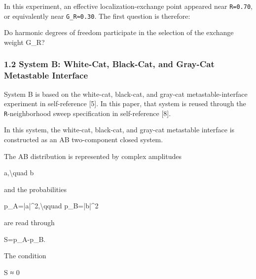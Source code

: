 \documentclass[
]{article}
\newenvironment{Shaded}{}{}
\newcommand{\NormalTok}[1]{#1}
\begin{document}
In this experiment, an effective localization-exchange point appeared
near \texttt{R=0.70}, or equivalently near \texttt{G\_R≈0.30}. The first
question is therefore:

\begin{Shaded}
\begin{Highlighting}[]
\NormalTok{Do harmonic degrees of freedom participate in the selection of the exchange weight G\_R?}
\end{Highlighting}
\end{Shaded}

\subsubsection{1.2 System B: White-Cat, Black-Cat, and Gray-Cat
Metastable
Interface}\label{system-b-white-cat-black-cat-and-gray-cat-metastable-interface}

System B is based on the white-cat, black-cat, and gray-cat
metastable-interface experiment in self-reference {[}5{]}. In this
paper, that system is reused through the \texttt{R}-neighborhood sweep
specification in self-reference {[}8{]}.

In this system, the white-cat, black-cat, and gray-cat metastable
interface is constructed as an AB two-component closed system.

The AB distribution is represented by complex amplitudes

\begin{Shaded}
\begin{Highlighting}[]
\NormalTok{a,\textbackslash{}quad b}
\end{Highlighting}
\end{Shaded}

and the probabilities

\begin{Shaded}
\begin{Highlighting}[]
\NormalTok{p\_A=|a|\^{}2,\textbackslash{}qquad p\_B=|b|\^{}2}
\end{Highlighting}
\end{Shaded}

are read through

\begin{Shaded}
\begin{Highlighting}[]
\NormalTok{S=p\_A{-}p\_B.}
\end{Highlighting}
\end{Shaded}

The condition

\begin{Shaded}
\begin{Highlighting}[]
\NormalTok{S ≈ 0}
\end{Highlighting}
\end{Shaded}
\end{document}
